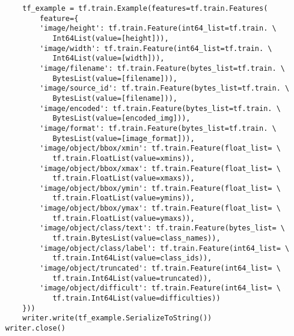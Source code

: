 \begin{verbatim}
        tf_example = tf.train.Example(features=tf.train.Features(
            feature={
            'image/height': tf.train.Feature(int64_list=tf.train. \
               Int64List(value=[height])),
            'image/width': tf.train.Feature(int64_list=tf.train. \
               Int64List(value=[width])),
            'image/filename': tf.train.Feature(bytes_list=tf.train. \
               BytesList(value=[filename])),
            'image/source_id': tf.train.Feature(bytes_list=tf.train. \
               BytesList(value=[filename])),
            'image/encoded': tf.train.Feature(bytes_list=tf.train. \
               BytesList(value=[encoded_img])),
            'image/format': tf.train.Feature(bytes_list=tf.train. \
               BytesList(value=[image_format])),
            'image/object/bbox/xmin': tf.train.Feature(float_list= \
               tf.train.FloatList(value=xmins)),
            'image/object/bbox/xmax': tf.train.Feature(float_list= \
               tf.train.FloatList(value=xmaxs)),
            'image/object/bbox/ymin': tf.train.Feature(float_list= \
               tf.train.FloatList(value=ymins)),
            'image/object/bbox/ymax': tf.train.Feature(float_list= \
               tf.train.FloatList(value=ymaxs)),
            'image/object/class/text': tf.train.Feature(bytes_list= \
               tf.train.BytesList(value=class_names)),
            'image/object/class/label': tf.train.Feature(int64_list= \
               tf.train.Int64List(value=class_ids)),
            'image/object/truncated': tf.train.Feature(int64_list= \
               tf.train.Int64List(value=truncated)),
            'image/object/difficult': tf.train.Feature(int64_list= \
               tf.train.Int64List(value=difficulties))
        }))
        writer.write(tf_example.SerializeToString())
    writer.close()
        \end{verbatim}
